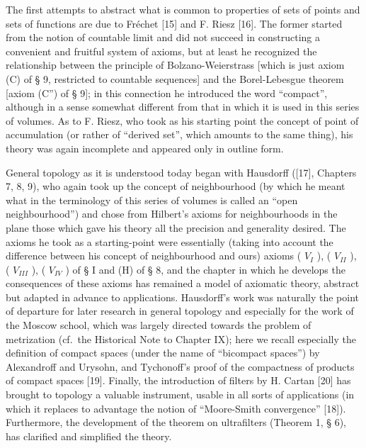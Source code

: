 The first attempts to abstract what is common to properties of sets of points and sets of functions are due to Fréchet {[}15{]} and F. Riesz {[}16{]}. The former started from the notion of countable limit and did not succeed in constructing a convenient and fruitful system of axioms, but at least he recognized the relationship between the principle of Bolzano-Weierstrass {[}which is just axiom (C) of § 9, restricted to countable sequences{]} and the Borel-Lebesgue theorem {[}axiom (C'') of § 9{]}; in this connection he introduced the word ``compact'', although in a sense somewhat different from that in which it is used in this series of volumes. As to F. Riesz, who took as his starting point the concept of point of accumulation (or rather of ``derived set'', which amounts to the same thing), his theory was again incomplete and appeared only in outline form.

General topology as it is understood today began with Hausdorff ({[}17{]}, Chapters 7, 8, 9), who again took up the concept of neighbourhood (by which he meant what in the terminology of this series of volumes is called an ``open neighbourhood'') and chose from Hilbert's axioms for neighbourhoods in the plane those which gave his theory all the precision and generality desired. The axioms he took as a starting-point were essentially (taking into account the difference between his concept of neighbourhood and ours) axioms ( \(V_{I}\) ), ( \(V_{II}\) ), ( \(V_{III}\) ), ( \(V_{IV}\) ) of § I and (H) of § 8, and the chapter in which he develops the consequences of these axioms has remained a model of axiomatic theory, abstract but adapted in advance to applications. Hausdorff's work was naturally the point of departure for later research in general topology and especially for the work of the Moscow school, which was largely directed towards the problem of metrization (cf.~the Historical Note to Chapter IX); here we recall especially the definition of compact spaces (under the name of ``bicompact spaces'') by Alexandroff and Urysohn, and Tychonoff's proof of the compactness of products of compact spaces {[}19{]}. Finally, the introduction of filters by H. Cartan {[}20{]} has brought to topology a valuable instrument, usable in all sorts of applications (in which it replaces to advantage the notion of ``Moore-Smith convergence'' {[}18{]}). Furthermore, the development of the theorem on ultrafilters (Theorem 1, § 6), has clarified and simplified the theory.

